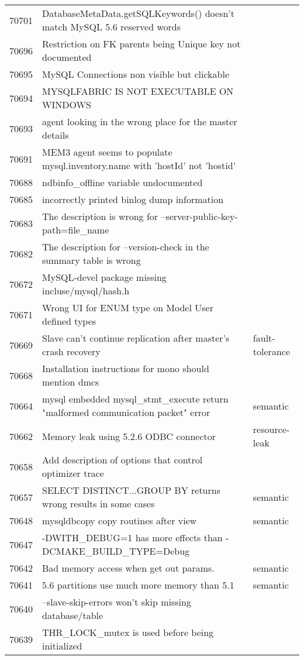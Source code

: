 \begin{longtable}[c]{p{1cm}p{10cm}p{1cm}}
70701 & DatabaseMetaData.getSQLKeywords() doesn't match MySQL 5.6 reserved words &  \\
70696 & Restriction on FK parents being Unique key not documented &  \\
70695 & MySQL Connections non visible but clickable &  \\
70694 & MYSQLFABRIC IS NOT EXECUTABLE ON WINDOWS &  \\
70693 & agent looking in the wrong place for the master details &  \\
70691 & MEM3 agent seems to populate mysql.inventory.name with 'hostId' not 'hostid' &  \\
70688 & ndbinfo\_offline variable undocumented &  \\
70685 & incorrectly printed binlog dump information &  \\
70683 & The description is wrong for --server-public-key-path=file\_name &  \\
70682 & The description for --version-check in the summary table is wrong &  \\
70672 & MySQL-devel package missing incluse/mysql/hash.h &  \\
70671 & Wrong UI for ENUM type on Model  User defined types &  \\
70669 & Slave can't continue replication after master's crash recovery & fault-tolerance \\
70668 & Installation instructions for mono should mention dmcs &  \\
70664 & mysql embedded mysql\_stmt\_execute return "malformed communication packet" error & semantic \\
70662 & Memory leak using 5.2.6 ODBC connector & resource-leak \\
70658 & Add description of options that control optimizer trace & \\
70657 & SELECT DISTINCT...GROUP BY returns wrong results in some cases & semantic \\
70648 & mysqldbcopy copy routines after view & semantic \\
70647 & -DWITH\_DEBUG=1 has more effects than -DCMAKE\_BUILD\_TYPE=Debug &  \\
70642 & Bad memory access when get out params. & semantic \\
70641 & 5.6 partitions use much more memory than 5.1 & semantic \\
70640 & --slave-skip-errors won't skip missing database/table &  \\
70639 & THR\_LOCK\_mutex is used before being initialized &  \\

\end{longtable}
